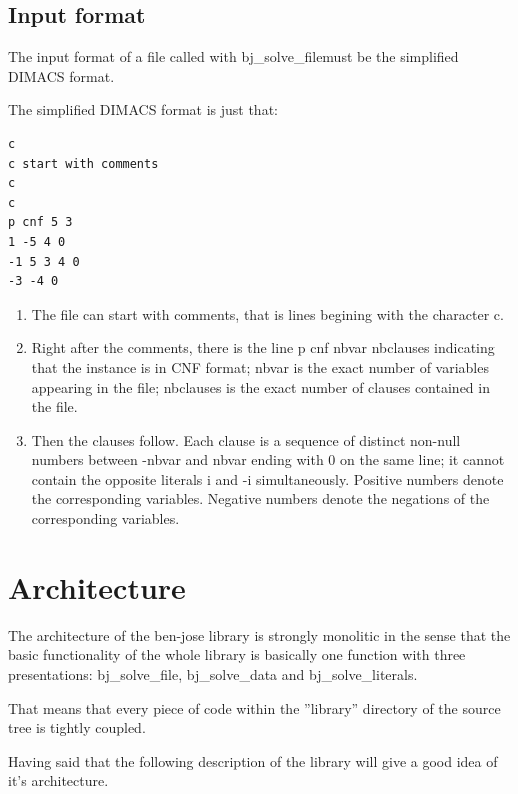 \documentclass{easychair}
\newcommand{\bjsolvefile}{bj\_solve\_file}
\newcommand{\bjsolvedata}{bj\_solve\_data}
\newcommand{\bjsolveliterals}{bj\_solve\_literals}
\begin{document}
\subsection{Input format}
\label{sect:dimacs}

The input format of a file called with \bjsolvefile must be the simplified DIMACS format.

The simplified DIMACS format is just that:

\begin{lstlisting}[label=dimacs-format, caption=Simplified DIMACS CNF format example,]
c
c start with comments
c
c 
p cnf 5 3
1 -5 4 0
-1 5 3 4 0
-3 -4 0
\end{lstlisting}

\begin{enumerate}
\item
The file can start with comments, that is lines begining with the character c.

\item
Right after the comments, there is the line p cnf nbvar nbclauses indicating that the instance is in CNF format; nbvar is the exact number of variables appearing in the file; nbclauses is the exact number of clauses contained in the file.

\item
Then the clauses follow. Each clause is a sequence of distinct non-null numbers between -nbvar and nbvar ending with 0 on the same line; it cannot contain the opposite literals i and -i simultaneously. Positive numbers denote the corresponding variables. Negative numbers denote the negations of the corresponding variables.
\end{enumerate}



\section{Architecture}
\label{sect:architecture}

The architecture of the ben-jose library is strongly monolitic in the sense that the basic functionality of the whole library is basically one function with three presentations: {\bjsolvefile}, {\bjsolvedata} and {\bjsolveliterals}.

That means that every piece of code within the ''library'' directory of the source tree is tightly coupled.

Having said that the following description of the library will give a good idea of it's architecture.
\end{document}
